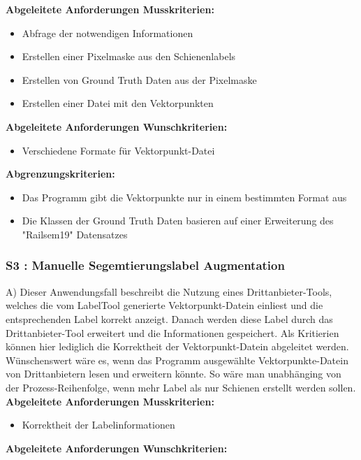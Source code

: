 \documentclass[11pt]{scrartcl}
\begin{document}
\noindent
\textbf{Abgeleitete Anforderungen Musskriterien:}

\begin{itemize}
	\item Abfrage der notwendigen Informationen
	\item Erstellen einer Pixelmaske aus den Schienenlabels
	\item Erstellen von Ground Truth Daten aus der Pixelmaske
	\item Erstellen einer Datei mit den Vektorpunkten
\end{itemize}
\textbf{Abgeleitete Anforderungen Wunschkriterien:}

\begin{itemize}
	\item Verschiedene Formate für Vektorpunkt-Datei
\end{itemize}
\textbf{Abgrenzungskriterien:}

\begin{itemize}
	\item Das Programm gibt die Vektorpunkte nur in einem bestimmten Format aus
	\item Die Klassen der Ground Truth Daten basieren auf einer Erweiterung des "Railsem19" Datensatzes
\end{itemize}

\subsubsection{S3 : Manuelle Segemtierungslabel Augmentation} 
\label{sec:S2 : Segmentationslabel Generierung}
A)
\noindent
Dieser Anwendungsfall beschreibt die Nutzung eines Drittanbieter-Tools, welches die vom LabelTool generierte Vektorpunkt-Datein einliest und die entsprechenden Label korrekt anzeigt. Danach werden diese Label durch das Drittanbieter-Tool erweitert und die Informationen gespeichert. Als Kritierien können hier lediglich die Korrektheit der Vektorpunkt-Datein abgeleitet werden. Wünschenswert wäre es, wenn das Programm ausgewählte Vektorpunkte-Datein von Drittanbietern lesen und erweitern könnte. So wäre man unabhänging von der Prozess-Reihenfolge, wenn mehr Label als nur Schienen erstellt werden sollen.
\\

\noindent
\textbf{Abgeleitete Anforderungen Musskriterien:}

\begin{itemize}
	\item Korrektheit der Labelinformationen
\end{itemize}
\textbf{Abgeleitete Anforderungen Wunschkriterien:}
\end{document}
